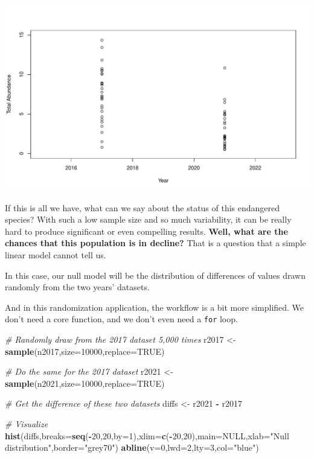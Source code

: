 \documentclass[
]{book}
\newenvironment{Shaded}{\begin{snugshade}}{\end{snugshade}}
\newcommand{\CommentTok}[1]{\textcolor[rgb]{0.56,0.35,0.01}{\textit{#1}}}
\newcommand{\DataTypeTok}[1]{\textcolor[rgb]{0.13,0.29,0.53}{#1}}
\newcommand{\DecValTok}[1]{\textcolor[rgb]{0.00,0.00,0.81}{#1}}
\newcommand{\KeywordTok}[1]{\textcolor[rgb]{0.13,0.29,0.53}{\textbf{#1}}}
\newcommand{\NormalTok}[1]{#1}
\newcommand{\OperatorTok}[1]{\textcolor[rgb]{0.81,0.36,0.00}{\textbf{#1}}}
\newcommand{\OtherTok}[1]{\textcolor[rgb]{0.56,0.35,0.01}{#1}}
\newcommand{\StringTok}[1]{\textcolor[rgb]{0.31,0.60,0.02}{#1}}
\begin{document}
\includegraphics{figures/unnamed-chunk-329-1.pdf}

If this is all we have, what can we say about the status of this endangered species? With such a low sample size and so much variability, it can be really hard to produce significant or even compelling results. \textbf{Well, what are the chances that this population is in decline?} That is a question that a simple linear model cannot tell us.

In this case, our null model will be the distribution of differences of values drawn randomly from the two years' datasets.

And in this randomization application, the workflow is a bit more simplified. We don't need a core function, and we don't even need a \texttt{for} loop.

\begin{Shaded}
\begin{Highlighting}[]
\CommentTok{# Randomly draw from the 2017 dataset 5,000 times}
\NormalTok{r2017 <-}\StringTok{ }\KeywordTok{sample}\NormalTok{(n2017,}\DataTypeTok{size=}\DecValTok{10000}\NormalTok{,}\DataTypeTok{replace=}\OtherTok{TRUE}\NormalTok{)}

\CommentTok{# Do the same for the 2017 dataset}
\NormalTok{r2021 <-}\StringTok{ }\KeywordTok{sample}\NormalTok{(n2021,}\DataTypeTok{size=}\DecValTok{10000}\NormalTok{,}\DataTypeTok{replace=}\OtherTok{TRUE}\NormalTok{)}

\CommentTok{# Get the difference of these two datasets}
\NormalTok{diffs <-}\StringTok{ }\NormalTok{r2021 }\OperatorTok{-}\StringTok{ }\NormalTok{r2017}

\CommentTok{# Visualize}
\KeywordTok{hist}\NormalTok{(diffs,}\DataTypeTok{breaks=}\KeywordTok{seq}\NormalTok{(}\OperatorTok{-}\DecValTok{20}\NormalTok{,}\DecValTok{20}\NormalTok{,}\DataTypeTok{by=}\DecValTok{1}\NormalTok{),}\DataTypeTok{xlim=}\KeywordTok{c}\NormalTok{(}\OperatorTok{-}\DecValTok{20}\NormalTok{,}\DecValTok{20}\NormalTok{),}\DataTypeTok{main=}\OtherTok{NULL}\NormalTok{,}\DataTypeTok{xlab=}\StringTok{"Null distribution"}\NormalTok{,}\DataTypeTok{border=}\StringTok{"grey70"}\NormalTok{)}
\KeywordTok{abline}\NormalTok{(}\DataTypeTok{v=}\DecValTok{0}\NormalTok{,}\DataTypeTok{lwd=}\DecValTok{2}\NormalTok{,}\DataTypeTok{lty=}\DecValTok{3}\NormalTok{,}\DataTypeTok{col=}\StringTok{"blue"}\NormalTok{)}
\end{Highlighting}
\end{Shaded}
\end{document}
